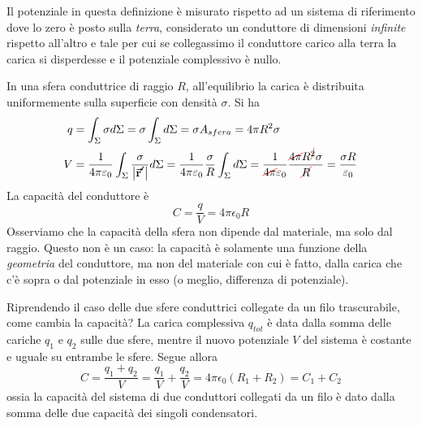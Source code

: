 Il potenziale in questa definizione è misurato rispetto ad un sistema di riferimento dove lo zero è posto sulla \textit{terra}, considerato un conduttore di dimensioni \textit{infinite} rispetto all'altro e tale per cui se collegassimo il conduttore carico alla terra la carica si disperdesse e il potenziale complessivo è nullo.
\begin{examplewt}
	In una sfera conduttrice di raggio $R$, all'equilibrio la carica è distribuita uniformemente sulla superficie con densità $\sigma$. Si ha
	\begin{align*}
		q&=\int_{\Sigma}\sigma d\Sigma=\sigma\int_{\Sigma}d\Sigma=\sigma A_{sfera}=4\pi R^2 \sigma\\
		V&=\frac{1}{4\pi\epsilon_0}\int_{\Sigma}\frac{\sigma}{\abs{\vba{r}'}}d\Sigma=\frac{1}{4\pi\epsilon_0}\frac{\sigma}{R}\int_{\Sigma}d\Sigma=\frac{1}{\Ccancel[red]{4\pi}\epsilon_0}\frac{\Ccancel[red]{4\pi} R^{\Ccancel[red]{2}} \sigma}{\Ccancel[red]{R}}=\frac{\sigma R}{\epsilon_0}
	\end{align*}
La capacità del conduttore è
\begin{equation}
	C=\frac{q}{V}=4\pi \epsilon_0 R
\end{equation}
Osserviamo che la capacità della sfera non dipende dal materiale, ma solo dal raggio. Questo non è un caso: la capacità è solamente una funzione della \textit{geometria} del conduttore, ma non del materiale con cui è fatto, dalla carica che c'è sopra o dal potenziale in esso (o meglio, differenza di potenziale).
\end{examplewt}
\begin{example}
	Riprendendo il caso delle due sfere conduttrici collegate da un filo trascurabile, come cambia la capacità? La carica complessiva $q_{tot}$ è data dalla somma delle cariche $q_1$ e $q_2$  sulle due sfere, mentre il nuovo potenziale $V$ del sistema è costante e uguale su entrambe le sfere. Segue allora
	\begin{equation}
		C=\frac{q_1+q_2}{V}=\frac{q_1}{V}+\frac{q_2}{V}=4\pi\epsilon_0\left(R_1+R_2\right)=C_1+C_2
	\end{equation} 
	ossia la capacità del sistema di due conduttori collegati da un filo è dato dalla somma delle due capacità dei singoli condensatori.
\end{example}
